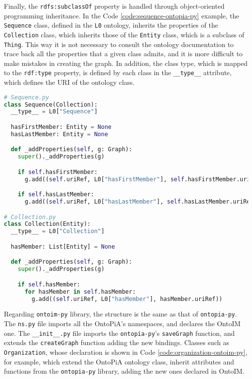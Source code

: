 Finally, the \verb#rdfs:subclassOf# property is handled through object-oriented programming inheritance. In the Code \ref{code:sequence-ontopia-py} example, the \verb#Sequence# class, defined in the \verb#L0# ontology, inherits the properties of the \verb#Collection# class, which inherits those of the \verb#Entity# class, which is a subclass of \verb#Thing#. This way it is not necessary to consult the ontology documentation to trace back all the properties that a given class admits, and it is more difficult to make mistakes in creating the graph. In addition, the class type, which is mapped to the \verb#rdf:type# property, is defined by each class in the \verb#__type__# attribute, which defines the \ac{URI} of the ontology class.

\begin{lstlisting}[language=python,caption={The ontopia-py's Sequence and Collection classes. Thanks to the object-oriented programming inheritance it is possible to map ontology classes and properties into Python classes and attributes.},label=code:sequence-ontopia-py]
# Sequence.py
class Sequence(Collection):
  __type__ = L0["Sequence"]

  hasFirstMember: Entity = None
  hasLastMember: Entity = None

  def _addProperties(self, g: Graph):
    super()._addProperties(g)

    if self.hasFirstMember:
      g.add((self.uriRef, L0["hasFirstMember"], self.hasFirstMember.uriRef))

    if self.hasLastMember:
      g.add((self.uriRef, L0["hasLastMember"], self.hasLastMember.uriRef))

# Collection.py
class Collection(Entity):
  __type__ = L0["Collection"]

  hasMember: List[Entity] = None

  def _addProperties(self, g: Graph):
    super()._addProperties(g)

    if self.hasMember:
      for hasMember in self.hasMember:
        g.add((self.uriRef, L0["hasMember"], hasMember.uriRef))
\end{lstlisting}

Regarding \verb#ontoim-py# library, the structure is the same as that of \verb#ontopia-py#. The \verb#ns.py# file imports all the OntoPiA's namespaces, and declares the \ac{OntoIM} one. The \verb#__init__.py# file imports the \verb#ontopia-py#'s \verb#saveGraph# function, and extends the \verb#createGraph# function adding the new bindings. Classes such as \verb#Organization#, whose declaration is shown in Code \ref{code:organization-ontoim-py}, for example, which extend the OntoPiA ontology class, inherit attributes and functions from the \verb#ontopia-py# library, adding the new ones declared in \ac{OntoIM}.

